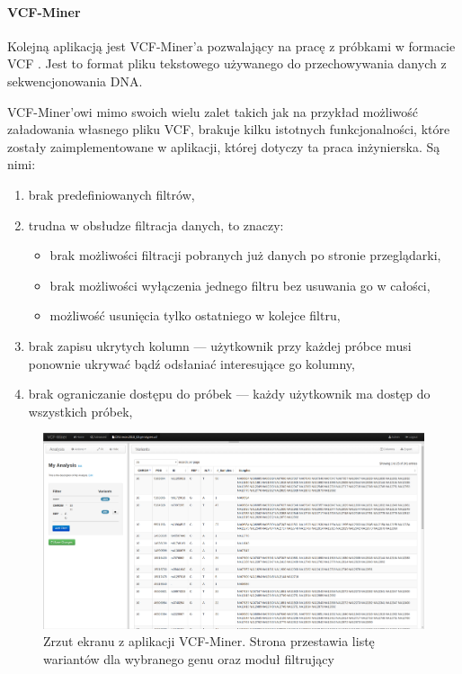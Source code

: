\documentclass[a4paper,12pt,twoside]{article}
\begin{document}
\paragraph{VCF-Miner}

Kolejną aplikacją jest VCF-Miner'a \cite{miner} \cite{minerArt} pozwalający na pracę z próbkami w formacie VCF \cite{vcfformat}. Jest to format pliku tekstowego używanego do przechowywania
danych z sekwencjonowania DNA.

VCF-Miner'owi mimo swoich wielu zalet takich jak na przykład możliwość
załadowania własnego pliku VCF, brakuje kilku istotnych funkcjonalności, które zostały zaimplementowane w aplikacji, której dotyczy ta praca inżynierska.
Są nimi:
\begin{enumerate}[1)]
\item brak predefiniowanych filtrów,
\item trudna w obsłudze filtracja danych, to znaczy:
\begin{itemize}
\item brak możliwości filtracji pobranych już danych po stronie przeglądarki,
\item brak możliwości wyłączenia jednego filtru bez usuwania go w całości,
\item możliwość usunięcia tylko ostatniego w kolejce filtru,
\end{itemize}
\item brak zapisu ukrytych kolumn — użytkownik przy każdej próbce
musi ponownie ukrywać bądź odsłaniać interesujące go kolumny,
\item brak ograniczanie dostępu do próbek — każdy użytkownik ma dostęp
do wszystkich próbek,
\end{enumerate}

\begin{figure}[H]
\includegraphics[width=\linewidth]{obrazy/exac/miner.png}
\caption{Zrzut ekranu z aplikacji VCF-Miner. Strona przestawia listę wariantów dla wybranego genu oraz moduł filtrujący}
\label{fig:minerpic}
\end{figure}
\end{document}

